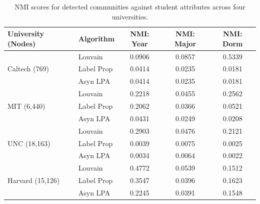 \documentclass[12pt]{article}
\begin{document}
\begin{table}[h!]
    \centering
    \begin{tabular}{|l|l|c|c|c|}
        \hline
        \textbf{University (Nodes)}       & \textbf{Algorithm} & \textbf{NMI: Year} & \textbf{NMI: Major} & \textbf{NMI: Dorm} \\ \hline
        \multirow{3}{*}{Caltech (769)}    & Louvain            & 0.0906             & 0.0857              & 0.5339             \\
                                          & Label Prop         & 0.0414             & 0.0235              & 0.0181             \\
                                          & Asyn LPA           & 0.0414             & 0.0235              & 0.0181             \\ \hline
        \multirow{3}{*}{MIT (6,440)}      & Louvain            & 0.2218             & 0.0455              & 0.2562             \\
                                          & Label Prop         & 0.2062             & 0.0366              & 0.0521             \\
                                          & Asyn LPA           & 0.0431             & 0.0249              & 0.0208             \\ \hline
        \multirow{3}{*}{UNC (18,163)}     & Louvain            & 0.2903             & 0.0476              & 0.2121             \\
                                          & Label Prop         & 0.0039             & 0.0075              & 0.0025             \\
                                          & Asyn LPA           & 0.0034             & 0.0064              & 0.0022             \\ \hline
        \multirow{3}{*}{Harvard (15,126)} & Louvain            & 0.4772             & 0.0539              & 0.1512             \\
                                          & Label Prop         & 0.3547             & 0.0396              & 0.1623             \\
                                          & Asyn LPA           & 0.2245             & 0.0391              & 0.1548             \\ \hline
    \end{tabular}
    \caption{NMI scores for detected communities against student attributes across four universities.}
    \label{tab:nmi_results}
\end{table}
\end{document}
